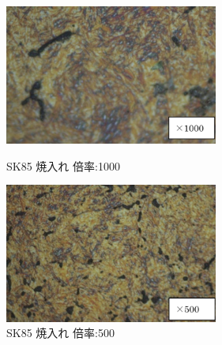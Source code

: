 \documentclass[10pt,a4j]{jsarticle}
\begin{document}
  \begin{figure}[htbp]
    \begin{minipage}{0.5\hsize}
      \begin{center}
        \includegraphics[width=7cm]{../img/SK85_yakiire_1000.png}
        \caption{SK85 焼入れ 倍率:1000}
      \end{center}
    \end{minipage}
    \begin{minipage}{0.5\hsize}
      \begin{center}
        \includegraphics[width=7cm]{../img/SK85_yakiire_500.png}
        \caption{SK85 焼入れ 倍率:500}
      \end{center}
    \end{minipage}
  \end{figure}
\end{document}

